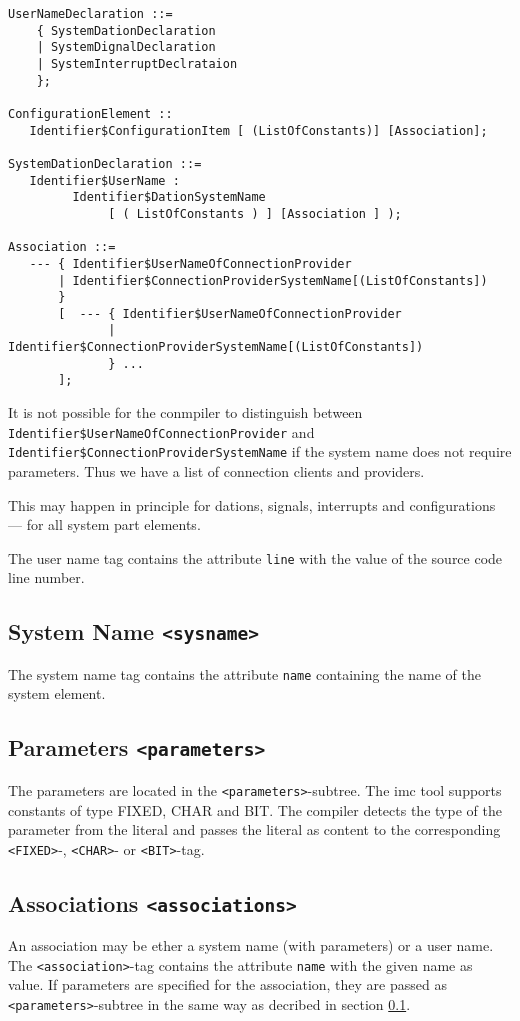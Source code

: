 \begin{verbatim}
UserNameDeclaration ::=
    { SystemDationDeclaration 
    | SystemDignalDeclaration 
    | SystemInterruptDeclrataion
    };

ConfigurationElement ::
   Identifier$ConfigurationItem [ (ListOfConstants)] [Association];

SystemDationDeclaration ::=
   Identifier$UserName : 
         Identifier$DationSystemName
              [ ( ListOfConstants ) ] [Association ] );

Association ::=
   --- { Identifier$UserNameOfConnectionProvider
       | Identifier$ConnectionProviderSystemName[(ListOfConstants])
       }
       [  --- { Identifier$UserNameOfConnectionProvider
              | Identifier$ConnectionProviderSystemName[(ListOfConstants])
              } ...
       ];
\end{verbatim}

It is not possible for the conmpiler to distinguish between 
\verb|Identifier$UserNameOfConnectionProvider| and 
\verb|Identifier$ConnectionProviderSystemName| if the system name does not 
require parameters.
Thus we have a list of connection clients and providers.

This may happen in principle for dations, signals, interrupts and configurations ---
for all system part elements.

The user name tag contains the attribute \verb|line| with the value of the 
source code line number.

\subsection{System Name \texttt{<sysname>}}
\label{sec_system_names}
The system name tag contains the attribute \verb|name| containing the 
name of the system element.

\subsection{Parameters \texttt{<parameters>}}
The parameters are located in the \verb|<parameters>|-subtree.
The imc tool supports constants of type FIXED, CHAR and BIT.
The compiler detects  the type of the parameter
from the literal and passes the literal as content to the corresponding
\verb|<FIXED>|-, \verb|<CHAR>|- or \verb|<BIT>|-tag.

\subsection{Associations \texttt{<associations>}}
An association may be ether a system name (with parameters) or a user name.
The  \verb|<association>|-tag contains the attribute \verb|name| with the 
given name as value. If parameters are specified for the association,
they are passed as \verb|<parameters>|-subtree in the same way as decribed 
in section \ref{sec_system_names}.

